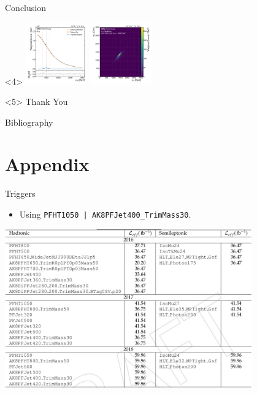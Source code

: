 \documentclass[]{beamer}
\begin{document}
\begin{frame}{Conclusion}
\begin{overlayarea}{\textwidth}{2.8cm}
\begin{center}
\begin{onlyenv}
      \end{onlyenv}
      \begin{onlyenv}<4>
        \includegraphics[width=0.2\textwidth]{figures/pull_sr_inj_signal_312_1500_1400__lb1150p0__r7p0__m1500p0_s90p0__w_1350p0_1650p0.pdf}
        \includegraphics[width=0.2\textwidth]{figures/m14_vs_m13_signal_312_1500_1400.pdf}
      \end{onlyenv}
      \begin{onlyenv}<5>
        \vspace{0.5cm}
        \Huge Thank You
      \end{onlyenv}
    \end{center}
  \end{overlayarea}
\end{frame}

\begin{frame}[allowframebreaks]{Bibliography}
  \nocite{monteux_new_2016}
  
   
\end{frame}
\appendix

\section{Appendix}



\begin{frame}{Triggers}
  \begin{itemize}
  \item Using \texttt{PFHT1050 | AK8PFJet400\_TrimMass30}.
  \end{itemize}
  \begin{center}
    \includegraphics[width=0.8\textwidth]{figures/triggertable.png}
  \end{center}
\end{frame}
\end{document}

